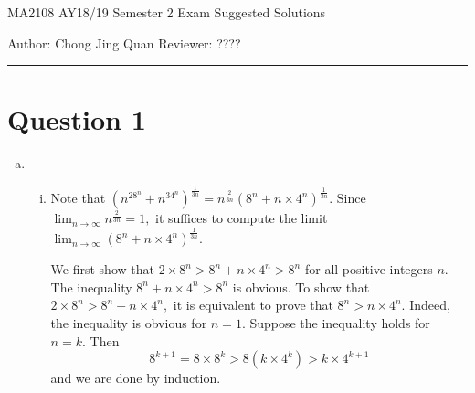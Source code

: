 \documentclass{article}
\begin{document}
    {\LARGE{MA2108 AY18/19 Semester 2 Exam Suggested Solutions}}
    \vspace{0.2in}
    
    Author: Chong Jing Quan \hfill Reviewer: ????
    
    \par\noindent\rule{\textwidth}{0.4pt}
\section*{Question 1}
\begin{enumerate}[(a)]
    \item \begin{enumerate}[(i)]
        \item Note that $\displaystyle(n^28^n+n^34^n)^{\frac{1}{3n}}=n^{\frac{2}{3n}}(8^n+n\times4^n)^{\frac{1}{3n}}.$ Since $\displaystyle\lim_{n\to\infty}n^{\frac{2}{3n}}=1,$ it suffices to compute the limit \newline $\displaystyle\lim_{n\to\infty}(8^n+n\times4^n)^{\frac{1}{3n}}.$
        
        We first show that $2\times8^n>8^n+n\times4^n>8^n$ for all positive integers $n.$ The inequality $8^n+n\times 4^n>8^n$ is obvious. To show that $2\times8^n>8^n+n\times4^n,$ it is equivalent to prove that $8^n>n\times4^n.$ Indeed, the inequality is obvious for $n=1.$ Suppose the inequality holds for $n=k.$ Then $$8^{k+1}=8\times8^k>8(k\times 4^k)>k\times 4^{k+1}$$ and we are done by induction.
        

\end{enumerate}
\end{enumerate}
\end{document}
